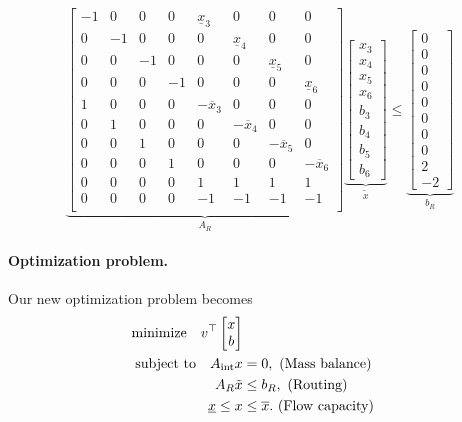 \[
\underbrace{\begin{bmatrix}
-1 & 0 & 0 & 0 & \underline{x}_3 & 0 & 0 & 0 \\
0 & -1 & 0 & 0 & 0 & \underline{x}_4 & 0 & 0 \\
0 & 0 & -1 & 0 & 0 & 0 & \underline{x}_5 & 0 \\
0 & 0 & 0 & -1 & 0 & 0 & 0 & \underline{x}_6 \\
1 & 0 & 0 & 0 & -\overline{x}_3 & 0 & 0 & 0 \\
0 & 1 & 0 & 0 & 0 & -\overline{x}_4 & 0 & 0 \\
0 & 0 & 1 & 0 & 0 & 0 & -\overline{x}_5 & 0 \\
0 & 0 & 0 & 1 & 0 & 0 & 0 & -\overline{x}_6 \\
0 & 0 & 0 & 0 & 1 & 1 & 1 & 1 \\
0 & 0 & 0 & 0 & -1 & -1 & -1 & -1 \\
\end{bmatrix}}_{A_R}
\underbrace{\begin{bmatrix}
x_3 \\ x_4 \\ x_5 \\ x_6 \\ b_3 \\ b_4 \\ b_5 \\ b_6
\end{bmatrix}}_{\tilde{x}}
\leq
\underbrace{\begin{bmatrix}
0 \\ 0 \\ 0 \\ 0 \\ 0 \\ 0 \\ 0 \\ 0 \\ 2 \\ -2
\end{bmatrix}}_{b_R}
\]

\paragraph{Optimization problem.} Our new optimization problem becomes
\begin{subequations}
\begin{align}
\mathrm{minimize} \ \ \  v^\top \begin{bmatrix} x \\ b \end{bmatrix} \\
\mathrm{subject\ to} \ \ \  A_{\mathrm{int}}x &= 0,\ \mathrm{(Mass\ balance)} \\
A_R \tilde{x} &\leq b_R,\ \mathrm{(Routing)} \label{eqn:routingconstr}\\
\underline{x} \leq x &\leq \overline{x}.\ \mathrm{(Flow\ capacity)}
\end{align}
\end{subequations}

